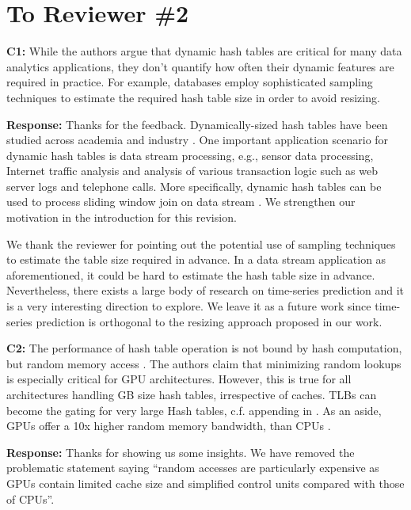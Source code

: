 \section*{To Reviewer \#2}

\begin{shaded}
	\noindent\textbf{C1:} While the authors argue that dynamic hash tables are critical for many data analytics applications, they don't quantify how often their dynamic features are required in practice. For example, databases employ sophisticated sampling techniques to estimate the required hash table size in order to avoid resizing. 
\end{shaded}
%
\noindent\textbf{Response:} 
Thanks for the feedback. Dynamically-sized hash tables have been studied across academia \cite{liu2014dynamic,ashkiani2018dynamic} and industry \cite{larson2003scaleable,douceur2000hash}. 
One important application scenario for dynamic hash tables is data stream processing, e.g., sensor data processing, Internet traffic analysis and analysis of various transaction logic such as web server logs and telephone calls. 
More specifically, dynamic hash tables can be used to process sliding window join on data stream \cite{golab2003processing}. We strengthen our motivation in the introduction for this revision.

We thank the reviewer for pointing out the potential use of sampling techniques to estimate the table size required in advance. In a data stream application as aforementioned, it could be hard to estimate the hash table size in advance. Nevertheless, there exists a large body of research on time-series prediction and it is a very interesting direction to explore. We leave it as a future work since time-series prediction is orthogonal to the resizing approach proposed in our work. 



\begin{shaded}
	\noindent\textbf{C2:} The performance of hash table operation is not bound by hash computation, but random memory access \cite{GPU-Join-A}. The authors claim that minimizing random lookups is especially critical for GPU architectures. However, this is true for all architectures handling GB size hash tables, irrespective of caches. TLBs can become the gating for very large Hash tables, c.f. appending in \cite{kaldewey2012gpu}. As an aside, GPUs offer a 10x higher random memory bandwidth, than CPUs \cite{GPU-Join-B}.
\end{shaded}
%
\noindent\textbf{Response:} 
Thanks for showing us some insights. 
We have removed the problematic statement saying ``random accesses are particularly expensive as GPUs contain limited cache size and simplified control units compared with those of CPUs''.

